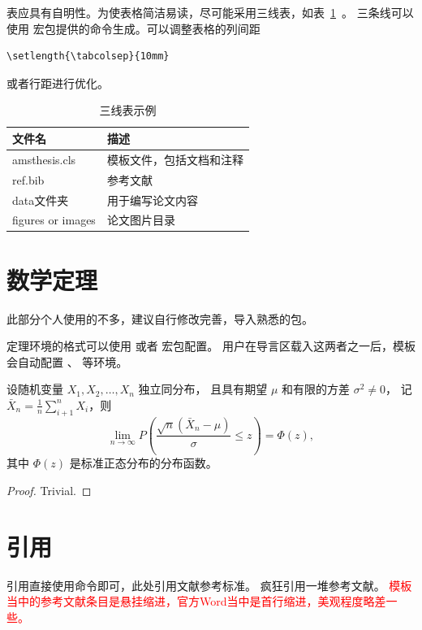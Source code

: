 \par 表应具有自明性。为使表格简洁易读，尽可能采用三线表，如表~\ref{tab:three-line}~。
三条线可以使用  宏包提供的命令生成。可以调整表格的列间距
\begin{verbatim}\setlength{\tabcolsep}{10mm}
\end{verbatim}或者行距进行优化。
\begin{table}[htb]
  \centering
  \caption{三线表示例}
  \setlength{\tabcolsep}{8mm}     %
  \begin{tabular}{ll}
    \toprule
    文件名             & 描述               \\
    \midrule
    amsthesis.cls   & 模板文件，包括文档和注释   \\
    ref.bib   & 参考文献             \\
    data文件夹 & 用于编写论文内容 \\
    figures or images & 论文图片目录 \\
    \bottomrule
  \end{tabular}
  \label{tab:three-line}
\end{table}


\section{数学定理}
此部分个人使用的不多，建议自行修改完善，导入熟悉的包。

定理环境的格式可以使用  或者  宏包配置。
用户在导言区载入这两者之一后，模板会自动配置 、 等环境。

\begin{theorem}
  设随机变量 $X_1, X_2, \dots, X_n$ 独立同分布， 且具有期望 $\mu$ 和有限的方差 $\sigma^2 \ne 0$，
  记 $\bar{X}_n = \frac{1}{n} \sum_{i+1}^n X_i$，则
  \begin{equation}
    \lim_{n \to \infty} P \left(\frac{\sqrt{n} \left( \bar{X}_n - \mu \right)}{\sigma} \le z \right) = \Phi(z),
  \end{equation}
  其中 $\Phi(z)$ 是标准正态分布的分布函数。
\end{theorem}
\begin{proof}
  Trivial.
\end{proof}






\section{引用}
引用直接使用命令即可，此处引用文献参考标准\cite{gbt7714-2005}。
疯狂引用一堆参考文献\cite{Gendron1991ComeonplusPA,gbt7714-2005,liende2020SG3}。
\textcolor{red}{模板当中的参考文献条目是悬挂缩进，官方Word当中是首行缩进，美观程度略差一些。}
